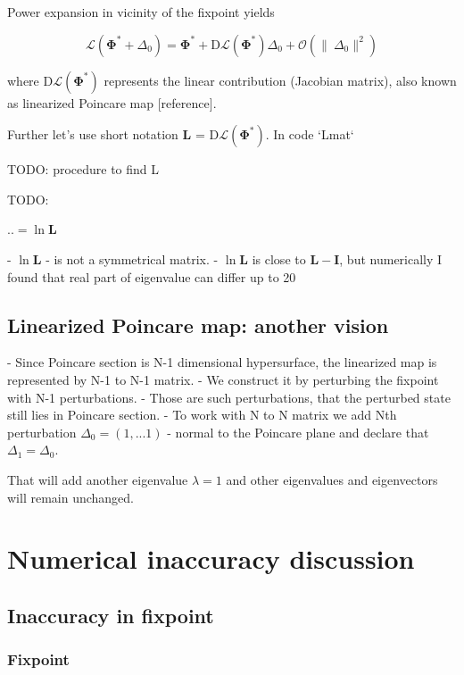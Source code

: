 \documentclass[a4paper,12pt]{article}
\newcommand{\D}{\Delta}%
\begin{document}
Power expansion in vicinity of the fixpoint yields

$$\mathcal{L}(\mathbf{\Phi^{*}} + \D_0) = \mathbf{\Phi^{*}} +  \mathrm{D}\mathcal{L}(\mathbf{\Phi^*}) \D_0 + \mathcal{O}(\lVert\ \D_0 \rVert^2) $$

where $\mathrm{D}\mathcal{L}(\mathbf{\Phi^*})$ represents the linear contribution (Jacobian matrix), also known as linearized Poincare map [reference].

Further let's use short notation $\mathbf{L}$ = $\mathrm{D}\mathcal{L}(\mathbf{\Phi^*})$. In code `Lmat`

TODO: procedure to find L

TODO:

$.. = \ln \mathbf{L} $


- $\ln \mathbf{L}$ - is not a symmetrical matrix.
- $ \ln \mathbf{L}$ is close to $\mathbf{L} - \mathbf{I}$, but numerically I found that real part of eigenvalue can differ up to 20%

\subsection{Linearized Poincare map: another vision}

- Since Poincare section is N-1 dimensional hypersurface, the linearized map is represented by N-1 to N-1 matrix.
- We construct it by perturbing the fixpoint with N-1 perturbations.
  - Those are such perturbations, that the perturbed state still lies in Poincare section.
  - To work with N to N matrix we add Nth perturbation $\D_0 = (1,...1)$ - normal to the Poincare plane and declare that $\D_1 = \D_0$.

   That will add another eigenvalue $\lambda=1$ and other eigenvalues and eigenvectors will remain unchanged.


\section{Numerical inaccuracy discussion}

\subsection{Inaccuracy in fixpoint}

\subsubsection{Fixpoint}
\end{document}
